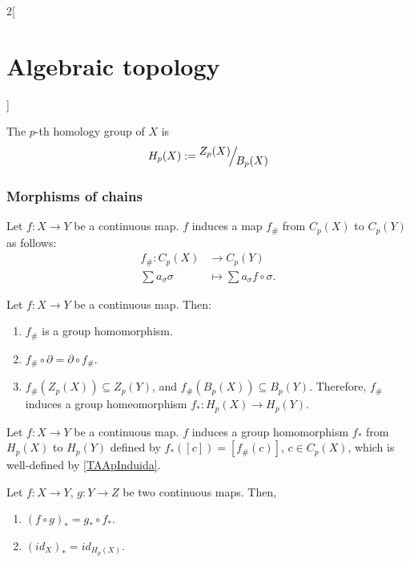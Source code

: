 \documentclass[../../../main_math.tex]{subfiles}
\begin{document}
\begin{multicols}{2}[\section{Algebraic topology}]
	\begin{definition}
		The $p$-th homology group of $X$ is $$H_p(X):=\quot{Z_p(X)}{B_p(X)}$$
	\end{definition}

	\subsubsection{Morphisms of chains}
	
	\begin{definition}
		Let $f: X \to Y$ be a continuous map. $f$ induces a map $f_{\#}$ from $C_p(X)$ to $C_p(Y)$ as follows:
		\begin{align*}
			f_{\#}: C_p(X) & \longrightarrow C_p(Y) \\
			\sum a_{\sigma} \sigma &\longmapsto \sum a_{\sigma} f\circ\sigma.
		\end{align*}
	
	\end{definition}

	\begin{proposition}\label{TAApInduida}
		Let $f:X\to Y$ be a continuous map. Then:
		\begin{enumerate}
			\item $f_{\#}$ is a group homomorphism.
			\item $f_{\#}\circ \partial= \partial \circ f_{\#}$.
			\item $f_{\#}(Z_p(X))\subseteq Z_p(Y)$, and $f_{\#}(B_p(X))\subseteq B_p(Y)$. Therefore, $f_{\#}$ induces a group homeomorphism $f_{*}: H_p(X) \to H_p(Y)$.
		\end{enumerate}
	\end{proposition}
	
	\begin{definition}
		Let $f: X \to Y$ be a continuous map. $f$ induces a group homomorphism $f_{*}$ from $H_p(X)$ to $H_p(Y)$ defined by $f_{*}([c])=[f_{\#}(c)]$, $c\in C_p(X)$, which is well-defined by \cref{TAApInduida}.
	\end{definition}
	
	\begin{proposition}
		Let $f:X\to Y$, $g:Y\to Z$ be two continuous maps. Then,
		\begin{enumerate}
			\item $(f\circ g)_{*}=g_{*}\circ f_{*}$.
			\item $(id_{X})_*=id_{H_p(X)}$.
		\end{enumerate}
	\end{proposition}


\end{multicols}
\end{document}
